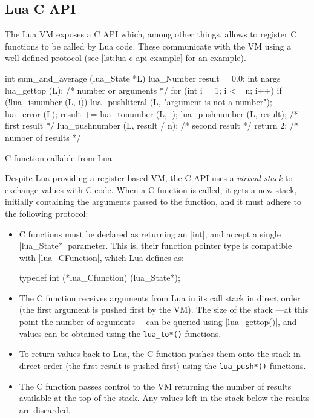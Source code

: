 \subsection{Lua C API}
	\label{sec:lua-c-api}

The Lua \gls{VM} exposes a C \gls{API} which, among other things, allows to
register C functions to be called by Lua code. These communicate with the VM
using a well-defined protocol (see \autoref{lst:lua-c-api-example}
for an example).

\begin{listing}[H]
	\begin{ccode}
  int sum_and_average (lua_State *L) {
    lua_Number result = 0.0;
    int nargs = lua_gettop (L); /* number or arguments */
    for (int i = 1; i <= n; i++) {
      if (!lua_isnumber (L, i)) {
        lua_pushliteral (L, "argument is not a number");
        lua_error (L);
      }
      result += lua_tonumber (L, i);
    }
    lua_pushnumber (L, result);        /* first result */
    lua_pushnumber (L, result / n);   /* second result */
    return 2;                     /* number of results */
  }
	\end{ccode}
	\caption{C function callable from Lua}
	\label{lst:lua-c-api-example}
\end{listing}

Despite Lua providing a register-based VM, the C API uses a \emph{virtual
stack} to exchange values with C code. When a C function is called, it gets
a new stack, initially containing the arguments passed to the function, and
it must adhere to the following protocol:

\begin{itemize}
	\item C functions must be declared as returning an \Mc|int|, and accept
		a single \Mc|lua_State*| parameter. This is, their function pointer
		type is compatible with \Mc|lua_CFunction|, which Lua defines as:
		\begin{ccode}
			typedef int (*lua_Cfunction) (lua_State*);
		\end{ccode}

	\item The C function receives arguments from Lua in its call stack in
		direct order (the first argument is pushed first by the VM). The size of
		the stack —at this point the number of arguments— can be queried using
		\Mc|lua_gettop()|, and values can be obtained using the \verb|lua_to*()|
		functions.

	\item To return values back to Lua, the C function pushes them onto the
		stack in direct order (the first result is pushed first) using the
		\verb|lua_push*()| functions.

	\item The C function passes control to the VM returning the number of
		results available at the top of the stack. Any values left in the
		stack below the results are discarded.

\end{itemize}

